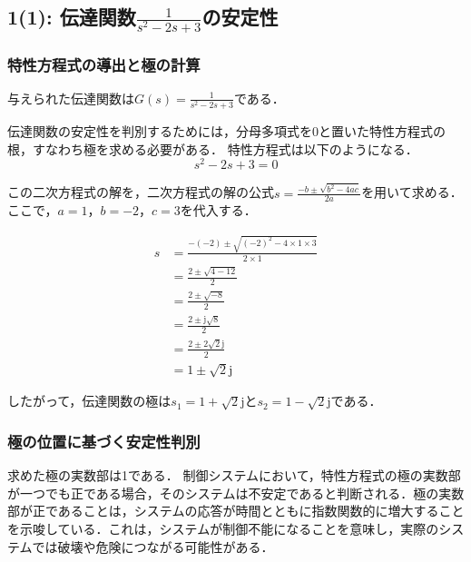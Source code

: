 \documentclass[11pt,a4paper]{ltjsarticle}
\begin{document}

\subsection{\texorpdfstring{1(1): 伝達関数$\frac{1}{s^2-2s+3}$の安定性}{1(1): 伝達関数の安定性}}

\subsubsection{特性方程式の導出と極の計算}

与えられた伝達関数は$G(s) = \frac{1}{s^2-2s+3}$である．

伝達関数の安定性を判別するためには，分母多項式を0と置いた特性方程式の根，すなわち極を求める必要がある．
特性方程式は以下のようになる．
\begin{equation}
s^2-2s+3=0
\end{equation}

この二次方程式の解を，二次方程式の解の公式$s = \frac{-b \pm \sqrt{b^2-4ac}}{2a}$を用いて求める．
ここで，$a=1$，$b=-2$，$c=3$を代入する．

\begin{align}
s &= \frac{-(-2) \pm \sqrt{(-2)^2-4 \times 1 \times 3}}{2 \times 1} \\
&= \frac{2 \pm \sqrt{4-12}}{2} \\
&= \frac{2 \pm \sqrt{-8}}{2} \\
&= \frac{2 \pm \mathrm{j}\sqrt{8}}{2} \\
&= \frac{2 \pm 2\sqrt{2}\mathrm{j}}{2} \\
&= 1 \pm \sqrt{2}\mathrm{j}
\end{align}

したがって，伝達関数の極は$s_1 = 1 + \sqrt{2}\mathrm{j}$と$s_2 = 1 - \sqrt{2}\mathrm{j}$である．

\subsubsection{極の位置に基づく安定性判別}

求めた極の実数部は1である．
制御システムにおいて，特性方程式の極の実数部が一つでも正である場合，そのシステムは不安定であると判断される．極の実数部が正であることは，システムの応答が時間とともに指数関数的に増大することを示唆している．これは，システムが制御不能になることを意味し，実際のシステムでは破壊や危険につながる可能性がある．
\end{document}
